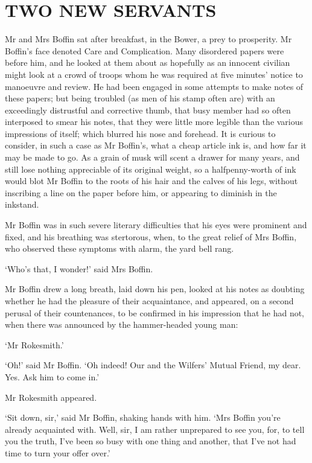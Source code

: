 
\chapter{TWO NEW SERVANTS}

Mr and Mrs Boffin sat after breakfast, in the Bower, a prey to
prosperity. Mr Boffin’s face denoted Care and Complication. Many
disordered papers were before him, and he looked at them about as
hopefully as an innocent civilian might look at a crowd of troops whom
he was required at five minutes’ notice to manoeuvre and review. He had
been engaged in some attempts to make notes of these papers; but being
troubled (as men of his stamp often are) with an exceedingly distrustful
and corrective thumb, that busy member had so often interposed to
smear his notes, that they were little more legible than the various
impressions of itself; which blurred his nose and forehead. It is
curious to consider, in such a case as Mr Boffin’s, what a cheap article
ink is, and how far it may be made to go. As a grain of musk will scent
a drawer for many years, and still lose nothing appreciable of its
original weight, so a halfpenny-worth of ink would blot Mr Boffin to the
roots of his hair and the calves of his legs, without inscribing a line
on the paper before him, or appearing to diminish in the inkstand.

Mr Boffin was in such severe literary difficulties that his eyes were
prominent and fixed, and his breathing was stertorous, when, to the
great relief of Mrs Boffin, who observed these symptoms with alarm, the
yard bell rang.

‘Who’s that, I wonder!’ said Mrs Boffin.

Mr Boffin drew a long breath, laid down his pen, looked at his notes
as doubting whether he had the pleasure of their acquaintance, and
appeared, on a second perusal of their countenances, to be confirmed
in his impression that he had not, when there was announced by the
hammer-headed young man:

‘Mr Rokesmith.’

‘Oh!’ said Mr Boffin. ‘Oh indeed! Our and the Wilfers’ Mutual Friend, my
dear. Yes. Ask him to come in.’

Mr Rokesmith appeared.

‘Sit down, sir,’ said Mr Boffin, shaking hands with him. ‘Mrs Boffin
you’re already acquainted with. Well, sir, I am rather unprepared to see
you, for, to tell you the truth, I’ve been so busy with one thing and
another, that I’ve not had time to turn your offer over.’

